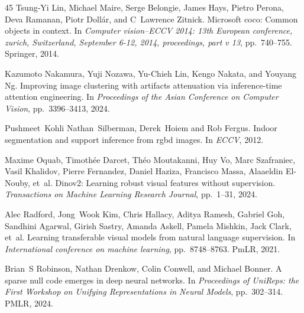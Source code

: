 \documentclass{article}
\begin{document}
\begin{thebibliography}{45}
Tsung-Yi Lin, Michael Maire, Serge Belongie, James Hays, Pietro Perona, Deva Ramanan, Piotr Doll{\'a}r, and C~Lawrence Zitnick.
\newblock Microsoft coco: Common objects in context.
\newblock In \emph{Computer vision--ECCV 2014: 13th European conference, zurich, Switzerland, September 6-12, 2014, proceedings, part v 13}, pp.\  740--755. Springer, 2014.

Kazumoto Nakamura, Yuji Nozawa, Yu-Chieh Lin, Kengo Nakata, and Youyang Ng.
\newblock Improving image clustering with artifacts attenuation via inference-time attention engineering.
\newblock In \emph{Proceedings of the Asian Conference on Computer Vision}, pp.\  3396--3413, 2024.

Pushmeet~Kohli Nathan~Silberman, Derek~Hoiem and Rob Fergus.
\newblock Indoor segmentation and support inference from rgbd images.
\newblock In \emph{ECCV}, 2012.

Maxime Oquab, Timoth{\'e}e Darcet, Th{\'e}o Moutakanni, Huy Vo, Marc Szafraniec, Vasil Khalidov, Pierre Fernandez, Daniel Haziza, Francisco Massa, Alaaeldin El-Nouby, et~al.
\newblock Dinov2: Learning robust visual features without supervision.
\newblock \emph{Transactions on Machine Learning Research Journal}, pp.\  1--31, 2024.

Alec Radford, Jong~Wook Kim, Chris Hallacy, Aditya Ramesh, Gabriel Goh, Sandhini Agarwal, Girish Sastry, Amanda Askell, Pamela Mishkin, Jack Clark, et~al.
\newblock Learning transferable visual models from natural language supervision.
\newblock In \emph{International conference on machine learning}, pp.\  8748--8763. PmLR, 2021.

Brian~S Robinson, Nathan Drenkow, Colin Conwell, and Michael Bonner.
\newblock A sparse null code emerges in deep neural networks.
\newblock In \emph{Proceedings of UniReps: the First Workshop on Unifying Representations in Neural Models}, pp.\  302--314. PMLR, 2024.


\end{thebibliography}
\end{document}
